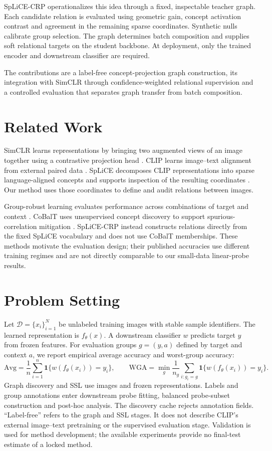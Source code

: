\documentclass[11pt,a4paper]{article}
\begin{document}
SpLiCE-CRP operationalizes this idea through a fixed, inspectable teacher graph.
Each candidate relation is evaluated using geometric gain, concept activation
contrast and agreement in the remaining sparse coordinates. Synthetic nulls
calibrate group selection. The graph determines batch composition and supplies
soft relational targets on the student backbone. At deployment, only the trained
encoder and downstream classifier are required.

The contributions are a label-free concept-projection graph construction, its
integration with SimCLR through confidence-weighted relational supervision and
a controlled evaluation that separates graph transfer from batch composition.

\section{Related Work}
SimCLR learns representations by bringing two augmented views of an image
together using a contrastive projection head \citep{chen2020simclr}. CLIP learns
image--text alignment from external paired data \citep{radford2021clip}.
SpLiCE decomposes CLIP representations into sparse language-aligned concepts
and supports inspection of the resulting coordinates \citep{bhalla2024splice}.
Our method uses those coordinates to define and audit relations between images.

Group-robust learning evaluates performance across combinations of target and
context \citep{sagawa2020groupdro}. CoBalT uses unsupervised concept discovery to
support spurious-correlation mitigation \citep{arefin2024cobalt}. SpLiCE-CRP
instead constructs relations directly from the fixed SpLiCE vocabulary and
does not use CoBalT memberships. These methods motivate the evaluation design;
their published accuracies use different training regimes and are not directly
comparable to our small-data linear-probe results.

\section{Problem Setting}
Let $\mathcal{D}=\{x_i\}_{i=1}^{N}$ be unlabeled training images with stable
sample identifiers. The learned representation is $f_\theta(x)$. A downstream
classifier $w$ predicts target $y$ from frozen features. For evaluation groups
$g=(y,a)$ defined by target and context $a$, we report empirical average accuracy
and worst-group accuracy:
\begin{equation}
 \mathrm{Avg}=\frac{1}{n}\sum_{i=1}^{n}\mathbf{1}\{w(f_\theta(x_i))=y_i\},\qquad
 \mathrm{WGA}=\min_g\frac{1}{n_g}\sum_{i:g_i=g}\mathbf{1}\{w(f_\theta(x_i))=y_i\}.
\end{equation}
Graph discovery and SSL use images and frozen representations. Labels and group
annotations enter downstream probe fitting, balanced probe-subset construction
and post-hoc analysis. The discovery cache rejects annotation fields.
``Label-free'' refers to the graph and SSL stages. It does not describe CLIP's
external image--text pretraining or the supervised evaluation stage. Validation
is used for method development; the available experiments provide no final-test
estimate of a locked method.
\end{document}
